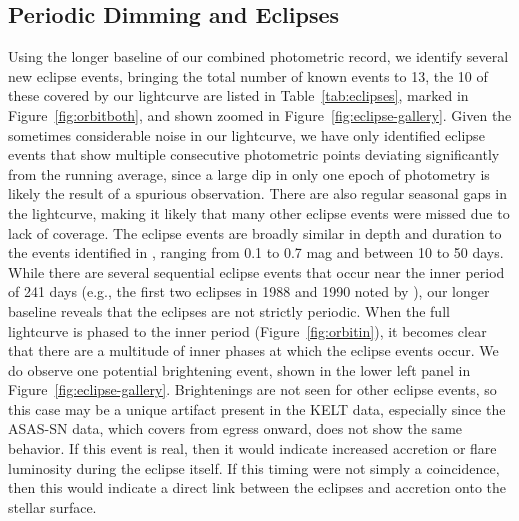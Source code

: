 \documentclass[twocolumn]{aastex61}
\begin{document}
\subsection{Periodic Dimming and Eclipses}
\label{sec:eclipses}
Using the longer baseline of our combined photometric record, we identify several new eclipse events, bringing the total number of known events to 13, the 10 of these covered by our lightcurve are listed in Table~\ref{tab:eclipses}, marked in Figure~\ref{fig:orbitboth}, and shown zoomed in Figure~\ref{fig:eclipse-gallery}. Given the sometimes considerable noise in our lightcurve, we have only identified eclipse events that show multiple consecutive photometric points deviating significantly from the running average, since a large dip in only one epoch of photometry is likely the result of a spurious observation. There are also regular seasonal gaps in the lightcurve, making it likely that many other eclipse events were missed due to lack of coverage.
The eclipse events are broadly similar in depth and duration to the events identified in \citet{shevchenko92,shevchenko98}, ranging from 0.1 to 0.7 mag and between 10 to 50 days. While there are several sequential eclipse events that occur near the inner period of 241 days (e.g., the first two eclipses in 1988 and 1990 noted by \citet{shevchenko92}), our longer baseline reveals that the eclipses are not strictly periodic.
When the full lightcurve is phased to the inner period (Figure~\ref{fig:orbitin}), it becomes clear that there are a multitude of inner phases at which the eclipse events occur.
We do observe one potential brightening event, shown in the lower left panel in Figure~\ref{fig:eclipse-gallery}. Brightenings are not seen for other eclipse events, so this case may be a unique artifact present in the KELT data, especially since the ASAS-SN data, which covers from egress onward, does not show the same behavior. If this event is real, then it would indicate increased accretion or flare luminosity during the eclipse itself. If this timing were not simply a coincidence, then this would indicate a direct link between the eclipses and accretion onto the stellar surface.
\end{document}
